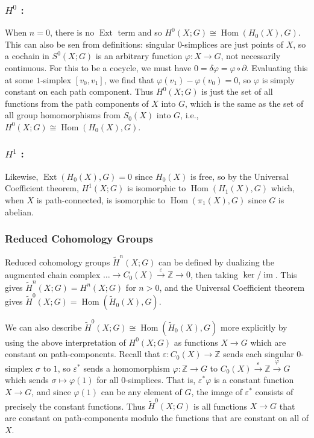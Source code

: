 \documentclass[reqno]{amsart}
\theoremstyle{definition}
\theoremstyle{remark}
\DeclareMathOperator{\im}{im}
\DeclareMathOperator{\Hom}{Hom}
\DeclareMathOperator{\Ext}{Ext}
\begin{document}
     \subsubsection{$H^{0}$ :} When $n = 0$, there
     is no $\Ext$ term and so
     $H^{0}(X;G) \cong \Hom (H_0(X),G)$.
     This can also be sen from definitions: singular
     $0$-simplices are just points of $X$, so
     a cochain in $S^{0}(X;G)$ is an
     arbitrary function $\varphi  \colon
     X \to G$, not necessarily continuous. For this to
     be a cocycle, we must have
     $0 = \delta \varphi = 
     \varphi \circ \partial $. Evaluating this
     at some $1$-simplex $\left[ v_0, v_1 \right] $, we
     find that $\varphi (v_1) - \varphi (v_0) = 0$, so
     $\varphi $ is simply constant on each path component.
     Thus $H^{0}(X;G)$ is just the set of all
     functions from the path components of $X$ into $G$, which 
     is the same as the set of all
     group homomorphisms from
     $S_0 (X)$ into $G$, i.e.,
     $H^{0}(X;G) \cong \Hom\left( H_0(X),G \right) $.

     \subsubsection{$H^{1}$ :} Likewise,
     $\Ext \left( H_0(X),G \right) = 0$ since
     $H_0(X)$ is free, so by the Universal Coefficient theorem,
     $H^{1}(X;G)$ is isomorphic to
     $\Hom\left( H_1(X),G \right)$ which, when
     $X$ is path-connected, is isomorphic to
     $\Hom\left( \pi_1(X),G \right) $ since $G$ is
     abelian.


     \subsubsection{Reduced Cohomology Groups}

     Reduced cohomology groups
     $\tilde{H}^{n}(X;G)$ can be defined by
     dualizing the augmented chain complex
     $\ldots \to C_0(X) \stackrel{\varepsilon}{\to} \mathbb{Z}
     \to 0$, then taking $\ker / \im$.
     This gives $\tilde{H}^{n}(X;G) = 
     H^{n}(X;G)$ for $n>0$, and the Universal Coefficient theorem
     gives $\tilde{H}^{0}(X;G) = 
     \Hom \left( \tilde{H}_0 (X),G \right) $.

     We can also describe 
     $\tilde{H}^{0}(X;G) \cong \Hom\left( \tilde{H}_0
     (X),G\right) $ more explicitly by using the above
     interpretation of $H^{0}(X;G)$ as functions
     $X \to G$ which are constant on path-components.
     Recall that $\varepsilon \colon
     C_0(X) \to \mathbb{Z}$ sends each
     singular $0$-simplex $\sigma$ to $1$, so
     $\varepsilon^{*}$ sends
     a homomorphism
     $\varphi  \colon \mathbb{Z} \to G$ to
     $C_0(X) \stackrel{\varepsilon}{\to} \mathbb{Z}
     \stackrel{\varphi }{\to} G$ which sends
     $\sigma \mapsto \varphi (1)$ for all
     $0$-simplices. That is,
     $\varepsilon^{*}\varphi $ is a constant
     function $X \to G$, and since
     $\varphi (1)$ can be any element of
     $G$, the image of $\varepsilon^{*}$ consists of precisely
     the constant functions.
     Thus $\tilde{H}^{0}(X;G)$ is all
     functions $X \to G$ that are constant on path-components
     modulo the functions that are constant on all of $X$.
\end{document}
